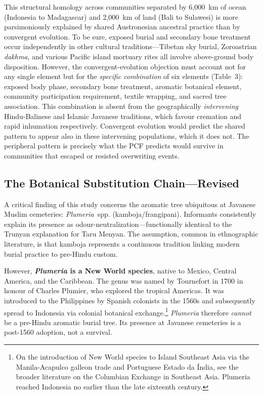 \documentclass[12pt,a4paper]{article}
\begin{document}
This structural homology across communities separated by 6,000~km of ocean (Indonesia to Madagascar) and 2,000~km of land (Bali to Sulawesi) is more parsimoniously explained by shared Austronesian ancestral practice than by convergent evolution. To be sure, exposed burial and secondary bone treatment occur independently in other cultural traditions---Tibetan sky burial, Zoroastrian \emph{dakhma}, and various Pacific island mortuary rites all involve above-ground body disposition. However, the convergent-evolution objection must account not for any single element but for the \emph{specific combination} of six elements (Table~3): exposed body phase, secondary bone treatment, aromatic botanical element, community participation requirement, textile wrapping, and sacred tree association. This combination is absent from the geographically \emph{intervening} Hindu-Balinese and Islamic Javanese traditions, which favour cremation and rapid inhumation respectively. Convergent evolution would predict the shared pattern to appear also in these intervening populations, which it does not. The peripheral pattern is precisely what the PCF predicts would survive in communities that escaped or resisted overwriting events.

\subsection{The Botanical Substitution Chain---Revised}
\label{sec:botanical}

A critical finding of this study concerns the aromatic tree ubiquitous at Javanese Muslim cemeteries: \emph{Plumeria}~spp. (kamboja/frangipani). Informants consistently explain its presence as odour-neutralization---functionally identical to the Trunyan explanation for Taru Menyan. The assumption, common in ethnographic literature, is that kamboja represents a continuous tradition linking modern burial practice to pre-Hindu custom.

However, \textbf{\emph{Plumeria} is a New World species}, native to Mexico, Central America, and the Caribbean. The genus was named by Tournefort in 1700 in honour of Charles Plumier, who explored the tropical Americas. It was introduced to the Philippines by Spanish colonists in the 1560s and subsequently spread to Indonesia via colonial botanical exchange.\footnote{On the introduction of New World species to Island Southeast Asia via the Manila-Acapulco galleon trade and Portuguese Estado da \'{I}ndia, see the broader literature on the Columbian Exchange in Southeast Asia. Plumeria reached Indonesia no earlier than the late sixteenth century.} \emph{Plumeria} therefore \emph{cannot} be a pre-Hindu aromatic burial tree. Its presence at Javanese cemeteries is a post-1560 adoption, not a survival.
\end{document}
